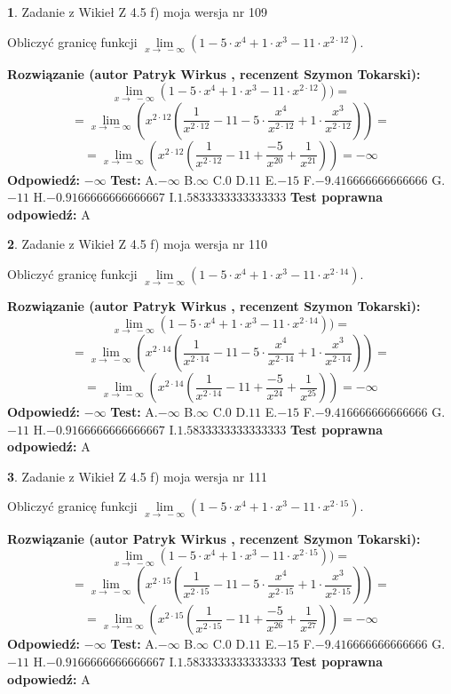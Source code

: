 \documentclass[12pt, a4paper]{article}
\theoremstyle{definition} %
\newtheorem{zad}{}
\newcommand{\zadStart}[1]{\begin{zad}#1\newline}
\newcommand{\zadStop}{\end{zad}}
\newcommand{\rozwStart}[2]{\noindent \textbf{Rozwiązanie (autor #1 , recenzent #2): }\newline}
\newcommand{\rozwStop}{\newline}
\newcommand{\odpStart}{\noindent \textbf{Odpowiedź:}\newline}
\newcommand{\odpStop}{\newline}
\newcommand{\testStart}{\noindent \textbf{Test:}\newline}
\newcommand{\testStop}{\newline}
\newcommand{\kluczStart}{\noindent \textbf{Test poprawna odpowiedź:}\newline}
\newcommand{\kluczStop}{\newline}
\begin{document}
\zadStart{Zadanie z Wikieł Z 4.5 f) moja wersja nr 109}


Obliczyć granicę funkcji  $\lim\limits_{x\to\ -\infty}(1 - 5 \cdot x^{4}+1 \cdot x^{3}- 11 \cdot x^{2\cdot12})$.
\zadStop
\rozwStart{Patryk Wirkus}{Szymon Tokarski}
$$\lim\limits_{x\to\ -\infty}(1 - 5 \cdot x^{4}+1 \cdot x^{3}- 11 \cdot x^{2\cdot12}))=$$
$$=\lim\limits_{x\to\ -\infty}(x^{2\cdot12}(\frac{1}{x^{2\cdot12}}-11 -5 \cdot \frac{x^{4}}{x^{2\cdot12}}+1 \cdot \frac{x^{3}}{x^{2\cdot12}}))=$$
$$=\lim\limits_{x\to\ -\infty}(x^{2\cdot12}(\frac{1}{x^{2\cdot12}}-11 + \frac{-5}{x^{20}}+ \frac{1}{x^{21}}))=-\infty$$
\rozwStop
\odpStart
$-\infty$
\odpStop
\testStart
A.$-\infty$ B.$\infty$ C.$0$ D.$11$ E.$-15$
F.$-9.416666666666666$ G.$-11$
H.$-0.9166666666666667$
I.$1.5833333333333333$
\testStop
\kluczStart
A
\kluczStop



\zadStart{Zadanie z Wikieł Z 4.5 f) moja wersja nr 110}


Obliczyć granicę funkcji  $\lim\limits_{x\to\ -\infty}(1 - 5 \cdot x^{4}+1 \cdot x^{3}- 11 \cdot x^{2\cdot14})$.
\zadStop
\rozwStart{Patryk Wirkus}{Szymon Tokarski}
$$\lim\limits_{x\to\ -\infty}(1 - 5 \cdot x^{4}+1 \cdot x^{3}- 11 \cdot x^{2\cdot14}))=$$
$$=\lim\limits_{x\to\ -\infty}(x^{2\cdot14}(\frac{1}{x^{2\cdot14}}-11 -5 \cdot \frac{x^{4}}{x^{2\cdot14}}+1 \cdot \frac{x^{3}}{x^{2\cdot14}}))=$$
$$=\lim\limits_{x\to\ -\infty}(x^{2\cdot14}(\frac{1}{x^{2\cdot14}}-11 + \frac{-5}{x^{24}}+ \frac{1}{x^{25}}))=-\infty$$
\rozwStop
\odpStart
$-\infty$
\odpStop
\testStart
A.$-\infty$ B.$\infty$ C.$0$ D.$11$ E.$-15$
F.$-9.416666666666666$ G.$-11$
H.$-0.9166666666666667$
I.$1.5833333333333333$
\testStop
\kluczStart
A
\kluczStop



\zadStart{Zadanie z Wikieł Z 4.5 f) moja wersja nr 111}


Obliczyć granicę funkcji  $\lim\limits_{x\to\ -\infty}(1 - 5 \cdot x^{4}+1 \cdot x^{3}- 11 \cdot x^{2\cdot15})$.
\zadStop
\rozwStart{Patryk Wirkus}{Szymon Tokarski}
$$\lim\limits_{x\to\ -\infty}(1 - 5 \cdot x^{4}+1 \cdot x^{3}- 11 \cdot x^{2\cdot15}))=$$
$$=\lim\limits_{x\to\ -\infty}(x^{2\cdot15}(\frac{1}{x^{2\cdot15}}-11 -5 \cdot \frac{x^{4}}{x^{2\cdot15}}+1 \cdot \frac{x^{3}}{x^{2\cdot15}}))=$$
$$=\lim\limits_{x\to\ -\infty}(x^{2\cdot15}(\frac{1}{x^{2\cdot15}}-11 + \frac{-5}{x^{26}}+ \frac{1}{x^{27}}))=-\infty$$
\rozwStop
\odpStart
$-\infty$
\odpStop
\testStart
A.$-\infty$ B.$\infty$ C.$0$ D.$11$ E.$-15$
F.$-9.416666666666666$ G.$-11$
H.$-0.9166666666666667$
I.$1.5833333333333333$
\testStop
\kluczStart
A
\kluczStop
\end{document}
